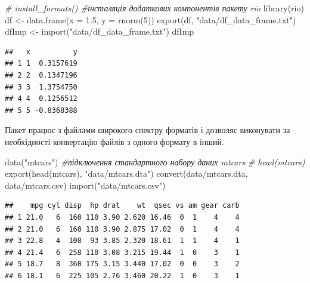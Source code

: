 \documentclass[
]{book}
\newenvironment{Shaded}{\begin{snugshade}}{\end{snugshade}}
\newcommand{\AttributeTok}[1]{\textcolor[rgb]{0.77,0.63,0.00}{#1}}
\newcommand{\CommentTok}[1]{\textcolor[rgb]{0.56,0.35,0.01}{\textit{#1}}}
\newcommand{\DecValTok}[1]{\textcolor[rgb]{0.00,0.00,0.81}{#1}}
\newcommand{\FunctionTok}[1]{\textcolor[rgb]{0.00,0.00,0.00}{#1}}
\newcommand{\NormalTok}[1]{#1}
\newcommand{\OtherTok}[1]{\textcolor[rgb]{0.56,0.35,0.01}{#1}}
\newcommand{\SpecialCharTok}[1]{\textcolor[rgb]{0.00,0.00,0.00}{#1}}
\newcommand{\StringTok}[1]{\textcolor[rgb]{0.31,0.60,0.02}{#1}}
\begin{document}
\begin{Shaded}
\begin{Highlighting}[]
\CommentTok{\# install\_formats() \#інсталяція додаткових компонентів пакету rio}
\FunctionTok{library}\NormalTok{(rio)}
\NormalTok{df }\OtherTok{\textless{}{-}} \FunctionTok{data.frame}\NormalTok{(}\AttributeTok{x =} \DecValTok{1}\SpecialCharTok{:}\DecValTok{5}\NormalTok{, }\AttributeTok{y =} \FunctionTok{rnorm}\NormalTok{(}\DecValTok{5}\NormalTok{))}
\FunctionTok{export}\NormalTok{(df, }\StringTok{"data/df\_data\_frame.txt"}\NormalTok{)}
\NormalTok{dfImp }\OtherTok{\textless{}{-}} \FunctionTok{import}\NormalTok{(}\StringTok{"data/df\_data\_frame.txt"}\NormalTok{)}
\NormalTok{dfImp}
\end{Highlighting}
\end{Shaded}

\begin{verbatim}
##   x          y
## 1 1  0.3157619
## 2 2  0.1347196
## 3 3  1.3754750
## 4 4  0.1256512
## 5 5 -0.8368388
\end{verbatim}

Пакет працює з файлами широкого спектру форматів і дозволяє виконувати за необхідності конвертацію файлів з одного формату в інший.

\begin{Shaded}
\begin{Highlighting}[]
\FunctionTok{data}\NormalTok{(}\StringTok{"mtcars"}\NormalTok{) }\CommentTok{\#підключення стандартного набору даних mtcars}
\CommentTok{\# head(mtcars)}
\FunctionTok{export}\NormalTok{(}\FunctionTok{head}\NormalTok{(mtcars), }\StringTok{"data/mtcars.dta"}\NormalTok{)}
\FunctionTok{convert}\NormalTok{(}\StringTok{\textquotesingle{}data/mtcars.dta\textquotesingle{}}\NormalTok{, }\StringTok{\textquotesingle{}data/mtcars.csv\textquotesingle{}}\NormalTok{)}
\FunctionTok{import}\NormalTok{(}\StringTok{"data/mtcars.csv"}\NormalTok{)}
\end{Highlighting}
\end{Shaded}

\begin{verbatim}
##    mpg cyl disp  hp drat    wt  qsec vs am gear carb
## 1 21.0   6  160 110 3.90 2.620 16.46  0  1    4    4
## 2 21.0   6  160 110 3.90 2.875 17.02  0  1    4    4
## 3 22.8   4  108  93 3.85 2.320 18.61  1  1    4    1
## 4 21.4   6  258 110 3.08 3.215 19.44  1  0    3    1
## 5 18.7   8  360 175 3.15 3.440 17.02  0  0    3    2
## 6 18.1   6  225 105 2.76 3.460 20.22  1  0    3    1
\end{verbatim}
\end{document}

